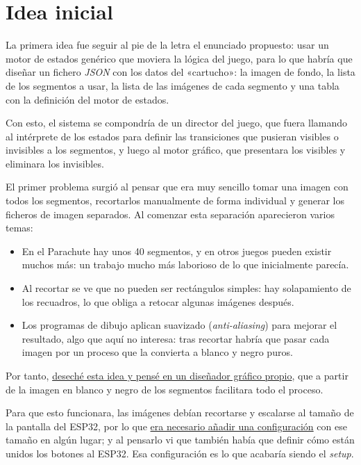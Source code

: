 \section{Idea inicial}
\label{sec:Fase0Resumen}

La primera idea fue seguir al pie de la letra el enunciado propuesto:
usar un motor de estados genérico que moviera la lógica del juego, para
lo que habría que diseñar un fichero \emph{JSON} con los datos del
«cartucho»: la imagen de fondo, la lista de los segmentos a usar, la
lista de las imágenes de cada segmento y una tabla con la definición
del motor de estados.

Con esto, el sistema se compondría de un director del juego, que fuera
llamando al intérprete de los estados para definir las transiciones que
pusieran visibles o invisibles a los segmentos, y luego al motor gráfico,
que presentara los visibles y eliminara los invisibles.

El primer problema surgió al pensar que era muy sencillo tomar una
imagen con todos los segmentos, recortarlos manualmente de forma
individual y generar los ficheros de imagen separados. Al comenzar esta
separación aparecieron varios temas:

\begin{itemize}
	\item En el Parachute hay unos 40 segmentos, y en otros juegos
	pueden existir muchos más: un trabajo mucho más laborioso de lo que
	inicialmente parecía.
	\item Al recortar se ve que no pueden ser rectángulos simples: hay
	solapamiento de los recuadros, lo que obliga a retocar algunas
	imágenes después.
	\item Los programas de dibujo aplican suavizado (\emph{anti-aliasing})
	para mejorar el resultado, algo que aquí no interesa: tras recortar
	habría que pasar cada imagen por un proceso que la convierta a blanco
	y negro puros.
\end{itemize}

Por tanto, \underline{deseché esta idea y pensé en un diseñador gráfico
	propio}, que a partir de la imagen en blanco y negro de los segmentos
facilitara todo el proceso.

Para que esto funcionara, las imágenes debían recortarse y escalarse al
tamaño de la pantalla del ESP32, por lo que \underline{era necesario
	añadir una configuración} con ese tamaño en algún lugar; y al pensarlo
vi que también había que definir cómo están unidos los botones al
ESP32. Esa configuración es lo que acabaría siendo el \emph{setup}.

